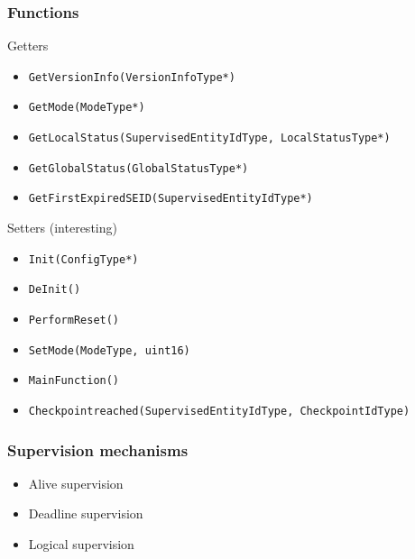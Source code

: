 \documentclass{beamer}
\begin{document}
\begin{frame}[fragile]
  \frametitle{Functions}
  \begin{block}{Getters}
    \begin{itemize}
      \item \lstinline!GetVersionInfo(VersionInfoType*)!
      \item \lstinline!GetMode(ModeType*)!
      \item \lstinline!GetLocalStatus(SupervisedEntityIdType, LocalStatusType*)!
      \item \lstinline!GetGlobalStatus(GlobalStatusType*)!
      \item \lstinline!GetFirstExpiredSEID(SupervisedEntityIdType*)!
    \end{itemize}
  \end{block}

  \begin{block}{Setters (interesting)}
    \begin{itemize}
      \item \lstinline!Init(ConfigType*)!
      \item \lstinline!DeInit()!
      \item \lstinline!PerformReset()!
      \item \lstinline!SetMode(ModeType, uint16)!
      \item \lstinline!MainFunction()!
      \item \lstinline!Checkpointreached(SupervisedEntityIdType, CheckpointIdType)!
    \end{itemize}
  \end{block}
\end{frame}

\begin{frame}
  \frametitle{Supervision mechanisms}
  \begin{itemize}
    \item Alive supervision
    \item Deadline supervision
    \item Logical supervision
  \end{itemize}
\end{frame}

\end{document}
